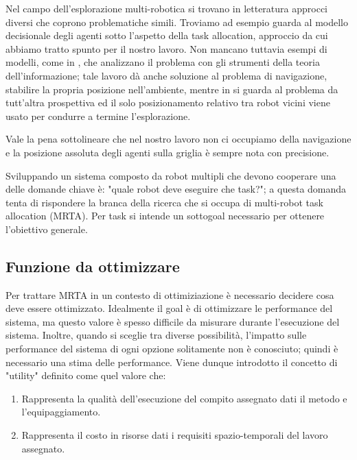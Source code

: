 Nel campo dell'esplorazione multi-robotica si trovano in letteratura approcci
diversi che coprono problematiche simili. 
Troviamo ad esempio \cite{gerkey2004formal} guarda al modello
decisionale degli agenti sotto l'aspetto della task allocation, approccio da cui abbiamo tratto spunto per il nostro lavoro.
Non mancano tuttavia esempi di modelli, come in \cite{bourgault2002information},
che analizzano il problema con gli strumenti della teoria dell'informazione;
tale lavoro dà anche soluzione al problema di navigazione, stabilire la propria
posizione nell'ambiente, mentre in \cite{dudek1996taxonomy} si guarda al
problema da tutt'altra prospettiva ed il solo posizionamento relativo tra robot
vicini viene usato per condurre a termine l'esplorazione.

Vale la pena sottolineare che nel nostro lavoro non ci occupiamo della
navigazione e la posizione assoluta degli agenti sulla griglia è sempre nota con
precisione.

\cite{gerkey2004formal} Sviluppando un sistema composto da robot multipli che devono cooperare 
una delle domande chiave è: "quale robot deve eseguire che task?"; 
a questa domanda tenta di rispondere la branca della ricerca che
si occupa di multi-robot task allocation (MRTA).
Per task si intende un sottogoal necessario per ottenere l'obiettivo generale.

\subsection{Funzione da ottimizzare}
  Per trattare MRTA in un contesto di ottimiziazione è necessario decidere cosa deve essere
  ottimizzato. Idealmente il goal è di ottimizzare le performance del sistema, ma questo valore
  è spesso difficile da misurare durante l'esecuzione del sistema.
  Inoltre, quando si sceglie tra diverse possibilità, l'impatto sulle performance del sistema di ogni opzione
  solitamente non è conosciuto; quindi è necessario una stima delle performance. Viene dunque introdotto
  il concetto di "utility" definito come quel valore che:
  \begin{enumerate}
    \item Rappresenta la qualità dell'esecuzione del compito assegnato dati il
          metodo e l'equipaggiamento.
    \item Rappresenta il costo in risorse dati i requisiti spazio-temporali del
          lavoro assegnato.
  \end{enumerate}
  

